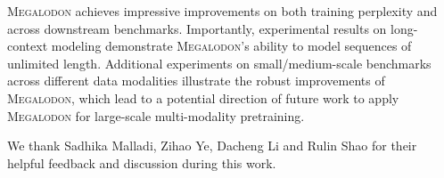 \textsc{Megalodon} achieves impressive improvements on both training perplexity and across downstream benchmarks. Importantly, experimental results on long-context modeling demonstrate \textsc{Megalodon}'s ability to model sequences of unlimited length. Additional experiments on small/medium-scale benchmarks across different data modalities illustrate the robust improvements of \textsc{Megalodon}, which lead to a potential direction of future work to apply \textsc{Megalodon} for large-scale multi-modality pretraining.

\begin{ack}
We thank Sadhika Malladi, Zihao Ye, Dacheng Li and Rulin Shao for their helpful feedback and discussion during this work.
\end{ack}


